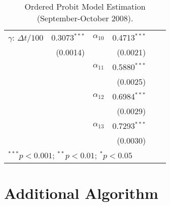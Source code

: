 \begin{table}[H]
\begin{center}
{\begin{tabular}{lrlrlr}
$\gamma$: \(\Delta t/100\) & 0.3073$^{***}$ & $\alpha_{10}$ & 0.4713$^{***}$ & & \\
 & (0.0014) & & (0.0021) & & \\
 
 & & $\alpha_{11}$ & 0.5880$^{***}$ & & \\
 & & & (0.0025) & & \\
 
 & & $\alpha_{12}$ & 0.6984$^{***}$ & & \\
 & & & (0.0029) & & \\
 
 & & $\alpha_{13}$ & 0.7293$^{***}$ & & \\
 & & & (0.0030) & & \\
\bottomrule
\multicolumn{6}{l}{\scriptsize{$^{***}p<0.001$; $^{**}p<0.01$; $^{*}p<0.05$}}
\end{tabular}
}
\caption{Ordered Probit Model Estimation (September-October 2008).}
\label{tab:table-26}
\end{center}
\end{table}





\chapter{Additional Algorithm}
\label{app:algo}

